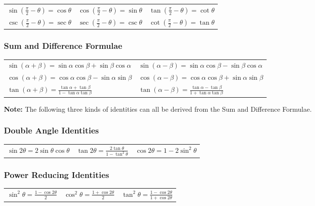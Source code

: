 \begin{tabular}{m{5.5cm} m{5.5cm} m}
   $\sin \left(\frac{\pi}{2}-\theta\right)=\cos \theta$ & $\cos \left(\frac{\pi}{2}-\theta\right)=\sin \theta$ & $\tan \left(\frac{\pi}{2}-\theta\right)=\cot \theta$ \\
   $\csc \left(\frac{\pi}{2}-\theta\right)=\sec \theta$ & $\sec \left(\frac{\pi}{2}-\theta\right)=\csc \theta$ & $\cot \left(\frac{\pi}{2}-\theta\right)=\tan \theta$
\end{tabular}

\subsubsection{Sum and Difference Formulae} \label{SDF}

\begin{tabular}{m{7cm} m}
    $\sin (\alpha+\beta)=\sin \alpha \cos \beta+\sin \beta \cos \alpha$ & $\sin (\alpha-\beta)=\sin \alpha \cos \beta-\sin \beta \cos \alpha$ \\
    $\cos (\alpha+\beta)=\cos \alpha \cos \beta-\sin \alpha \sin \beta$ & $\cos (\alpha-\beta)=\cos \alpha \cos \beta+\sin \alpha \sin \beta$\\
    $\tan (\alpha+\beta)=\frac{\tan \alpha+\tan \beta}{1-\tan \alpha \tan \beta}$ & $\tan(\alpha-\beta)=\frac{\tan \alpha-\tan \beta}{1+\tan \alpha \tan \beta}$
\end{tabular}

\textbf{Note:} The following three kinds of identities can all be derived from the Sum and Difference Formulae.

\subsubsection{Double Angle Identities}

\begin{tabular}{m{5.5cm} m{5.5cm} m}
    $\sin 2 \theta=2 \sin \theta \cos \theta$ & $\tan 2 \theta=\frac{2 \tan \theta}{1-\tan ^2 \theta}$ & $\cos 2 \theta =1-2 \sin ^2 \theta$ \\
\end{tabular}

\subsubsection{Power Reducing Identities}

\begin{tabular}{m{5.5cm} m{5.5cm} m}
    $\sin ^2 \theta=\frac{1-\cos 2 \theta}{2}$ & $\cos ^2 \theta=\frac{1+\cos 2 \theta}{2}$ & $\tan ^2 \theta=\frac{1-\cos 2 \theta}{1+\cos 2 \theta}$ \\
\end{tabular}

